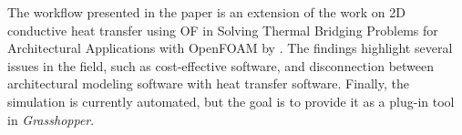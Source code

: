The workflow presented in the paper is an extension of the work on 2D conductive heat transfer using OF in Solving Thermal Bridging Problems for Architectural Applications with OpenFOAM by \cite{kastner2020solving}.  
The findings highlight several issues in the field, such as cost-effective software, and disconnection between architectural modeling software with heat transfer software. Finally, the simulation is currently automated, but the goal is to provide it as a plug-in tool in \textit{Grasshopper}.


